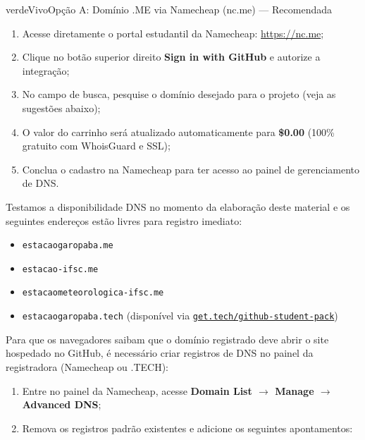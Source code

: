 \begin{destaque}{verdeVivo}{\faGlobe}{Opção A: Domínio .ME via Namecheap (nc.me) — Recomendada}
\begin{enumerate}
  \item Acesse diretamente o portal estudantil da Namecheap: \url{https://nc.me};
  \item Clique no botão superior direito \textbf{Sign in with GitHub} e autorize a integração;
  \item No campo de busca, pesquise o domínio desejado para o projeto (veja as sugestões abaixo);
  \item O valor do carrinho será atualizado automaticamente para \textbf{\$0.00} (100\% gratuito com WhoisGuard e SSL);
  \item Conclua o cadastro na Namecheap para ter acesso ao painel de gerenciamento de DNS.
\end{enumerate}
\end{destaque}

\begin{boxDica}
Testamos a disponibilidade DNS no momento da elaboração deste material e os seguintes endereços estão livres para registro imediato:
\begin{itemize}
  \item \texttt{estacaogaropaba.me}
  \item \texttt{estacao-ifsc.me}
  \item \texttt{estacaometeorologica-ifsc.me}
  \item \texttt{estacaogaropaba.tech} (disponível via \href{https://get.tech/github-student-pack}{\texttt{get.tech/github-student-pack}})
\end{itemize}
\end{boxDica}


Para que os navegadores saibam que o domínio registrado deve abrir o site hospedado no GitHub, é necessário criar registros de DNS no painel da registradora (Namecheap ou .TECH):

\begin{enumerate}
  \item Entre no painel da Namecheap, acesse \textbf{Domain List $\rightarrow$ Manage $\rightarrow$ Advanced DNS};
  \item Remova os registros padrão existentes e adicione os seguintes apontamentos:
\end{enumerate}


